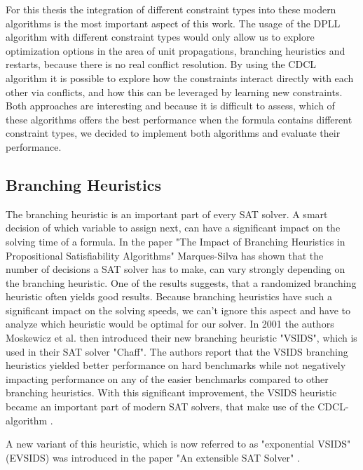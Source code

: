 For this thesis the integration of different constraint types into these modern algorithms is the most important aspect of this work. The usage of the DPLL algorithm with different constraint types would only allow us to explore optimization options in the area of unit propagations, branching heuristics and restarts, because there is no real conflict resolution. By using the CDCL algorithm it is possible to explore how the constraints interact directly with each other via conflicts, and how this can be leveraged by learning new constraints. Both approaches are interesting and because it is difficult to assess, which of these algorithms offers the best performance when the formula contains different constraint types, we decided to implement both algorithms and evaluate their performance.

\subsection{Branching Heuristics}

The branching heuristic is an important part of every SAT solver. A smart decision of which variable to assign next, can have a significant impact on the solving time of a formula. In the paper "The Impact of Branching Heuristics in
Propositional Satisfiability Algorithms" \cite{marques1999impact} Marques-Silva has shown that the number of decisions a SAT solver has to make, can vary strongly depending on the branching heuristic. One of the results suggests, that a randomized branching heuristic often yields good results. Because branching heuristics have such a significant impact on the solving speeds, we can't ignore this aspect and have to analyze which heuristic would be optimal for our solver. In 2001 the authors Moskewicz et al. \cite{moskewicz2001chaff} then introduced their new branching heuristic "VSIDS", which is used in their SAT solver "Chaff". The authors report that the VSIDS branching heuristics yielded better performance on hard benchmarks while not negatively impacting performance on any of the easier benchmarks \cite{moskewicz2001chaff} compared to other branching heuristics. With this significant improvement, the VSIDS heuristic became an important part of modern SAT solvers, that make use of the CDCL-algorithm \cite{biere2015evaluating}. 

A new variant of this heuristic, which is now referred to as "exponential VSIDS" (EVSIDS) \cite{biere2015evaluating} was introduced in the paper "An extensible SAT Solver" \cite{een2003extensible}. 

